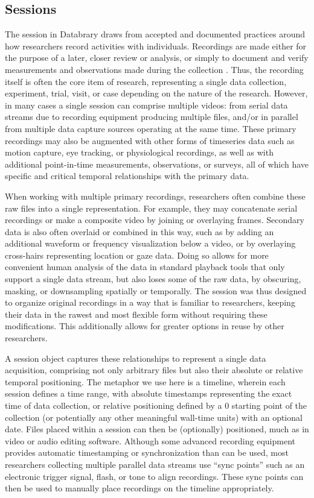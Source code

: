 \documentclass{sig-alternate}
\begin{document}
\subsection{Sessions}

The session in Databrary draws from accepted and documented practices around how researchers record activities with individuals.
Recordings are made either for the purpose of a later, closer review or analysis, or simply to document and verify measurements and observations made during the collection \cite{Bakeman_2012}.
Thus, the recording itself is often the core item of research, representing a single data collection, experiment, trial, visit, or case depending on the nature of the research.
However, in many cases a single session can comprise multiple videos: from serial data streams due to recording equipment producing multiple files, and/or in parallel from multiple data capture sources operating at the same time.
These primary recordings may also be augmented with other forms of timeseries data such as motion capture, eye tracking, or physiological recordings, as well as with additional point-in-time measurements, observations, or surveys, all of which have specific and critical temporal relationships with the primary data.

When working with multiple primary recordings, researchers often combine these raw files into a single representation.
For example, they may concatenate serial recordings or make a composite video by joining or overlaying frames.
Secondary data is also often overlaid or combined in this way, such as by adding an additional waveform or frequency visualization below a video, or by overlaying cross-hairs representing location or gaze data.
Doing so allows for more convenient human analysis of the data in standard playback tools that only support a single data stream, but also loses some of the raw data, by obscuring, masking, or downsampling spatially or temporally.
The session was thus designed to organize original recordings in a way that is familiar to researchers, keeping their data in the rawest and most flexible form without requiring these modifications.
This additionally allows for greater options in reuse by other researchers.

A session object captures these relationships to represent a single data acquisition, comprising not only arbitrary files but also their absolute or relative temporal positioning.
The metaphor we use here is a timeline, wherein each session defines a time range, with absolute timestamps representing the exact time of data collection, or relative positioning defined by a 0 starting point of the collection (or potentially any other meaningful wall-time units) with an optional date.
Files placed within a session can then be (optionally) positioned, much as in video or audio editing software.
Although some advanced recording equipment provides automatic timestamping or synchronization than can be used, most researchers collecting multiple parallel data streams use ``sync points'' such as an electronic trigger signal, flash, or tone to align recordings.
These sync points can then be used to manually place recordings on the timeline appropriately.
\end{document}
